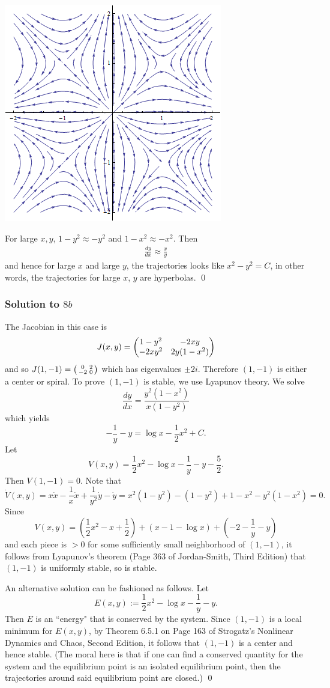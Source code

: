 \begin{center}
\includegraphics[scale=0.75]{./_Figures/S158.png}
\end{center}

For large $x, y$, $1 - y^{2} \approx -y^{2}$ and $1 - x^{2} \approx -x^{2}$. Then
\begin{align*}
\frac{dy}{dx} \approx \frac{x}{y}
\end{align*}
and hence for large $x$ and large $y$, the trajectories looks like $x^{2} - y^{2} = C$, in other words, the trajectories for large $x$, $y$
are hyperbolas.
\hfill\qed

\subsubsection*{Solution to $8b$}
The Jacobian in this case is
$$J(x, y) = \begin{pmatrix} 1 - y^{2} & -2xy \\ -2xy^{2} & 2y(1 - x^{2})\end{pmatrix}$$
and so $J(1, -1) = \left(\begin{smallmatrix} 0 & 2 \\ -2 & 0\end{smallmatrix}\right)$ which has eigenvalues $\pm 2i$. Therefore $(1, -1)$ is either a center or spiral.
To prove $(1, -1)$ is stable, we use Lyapunov theory. We solve
$$\frac{dy}{dx} = \frac{y^{2}(1 - x^{2})}{x(1 - y^{2})}$$
which yields
$$-\frac{1}{y} - y = \log x - \frac{1}{2}x^{2} + C.$$
Let $$V(x, y) = \frac{1}{2}x^{2} - \log x - \frac{1}{y} - y - \frac{5}{2}.$$
Then $V(1, -1) = 0$. Note that
$$\dot{V}(x, y) = x\dot{x} - \frac{1}{x}\dot{x} + \frac{1}{y^{2}}\dot{y} - \dot{y} = x^{2}(1 - y^{2}) - (1 - y^{2}) + 1 - x^{2} - y^{2}(1 - x^{2}) = 0.$$
Since
$$V(x, y) = (\frac{1}{2}x^{2} - x + \frac{1}{2}) + (x - 1 - \log x) + (-2 - \frac{1}{y} - y)$$
and each piece is $> 0$ for some sufficiently small neighborhood of $(1, -1)$, it follows from Lyapunov's theorem
(Page 363 of Jordan-Smith, Third Edition) that $(1, -1)$ is uniformly stable, so is stable.

An alternative solution can be fashioned as follows. Let
$$E(x, y) := \frac{1}{2}x^{2} - \log x - \frac{1}{y} - y.$$
Then $E$ is an ``energy" that is conserved by the system. Since $(1, -1)$ is a local minimum for $E(x, y)$, by Theorem 6.5.1 on Page 163 of
Strogatz's Nonlinear Dynamics and Chaos, Second Edition, it follows that $(1, -1)$ is a center and hence stable.
(The moral here is that if one can find a conserved quantity for the system and the equilibrium point is an isolated
equilibrium point, then the trajectories around said equilibrium point are closed.)
\hfill\qed
